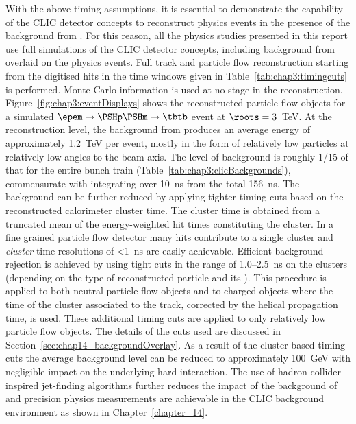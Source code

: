 With the above timing assumptions, it is essential to demonstrate the capability of the CLIC detector concepts to
reconstruct physics events in the presence of the background from \gghadrons. For this reason, all the physics 
studies presented in this report use full \geant simulations of the CLIC detector concepts,
including background from \gghadrons overlaid on the physics events. Full track and particle flow reconstruction 
starting from the digitised hits in the time windows given in Table~\ref{tab:chap3:timingcuts} is performed.
Monte Carlo information is used at no stage in the reconstruction. Figure~\ref{fig:chap3:eventDisplays} shows the 
reconstructed particle flow objects for a simulated 
$\epem\rightarrow\PSHp\PSHm\rightarrow \tbtb$ 
event at $\roots=3$~TeV. At the reconstruction level, the background from \gghadrons produces an average energy 
of approximately 1.2~TeV per event, mostly in the form of relatively low \pT particles at relatively 
low angles to the beam axis. 
The level of \gghadrons background is roughly 1/15 of that for the entire bunch train 
(Table~\ref{tab:chap3:clicBackgrounds}), commensurate with integrating over 10~ns from the total 156~ns. 
The background can be further reduced by applying tighter timing cuts based on the reconstructed calorimeter 
cluster time. The cluster time is obtained from a truncated mean of the energy-weighted hit times constituting the cluster. In a fine grained 
particle flow detector many hits contribute to a single cluster and {\it cluster} time resolutions of <1~ns are easily
achievable. 
Efficient background rejection is achieved by using tight cuts in the range of 1.0--2.5~ns on the 
clusters (depending on the type of reconstructed 
particle and its \pT). This procedure is applied to both neutral particle flow objects and to charged objects where the 
time of the cluster associated to the track, corrected by the helical propagation time, is used. These additional timing 
cuts are applied to only relatively low \pT particle flow objects. The details of the cuts
used are discussed in 
Section~\ref{sec:chap14_backgroundOverlay}. As a result of the cluster-based timing cuts
the average 
background level can be reduced to approximately 100~GeV with negligible impact on the underlying hard 
interaction. The use of hadron-collider inspired jet-finding algorithms further reduces the impact of the background 
of \gghadrons and precision physics measurements are achievable in the CLIC background environment as 
shown in Chapter~\ref{chapter_14}.

